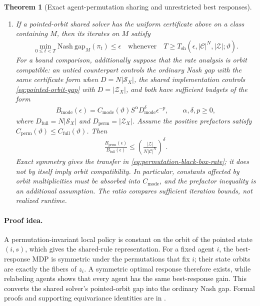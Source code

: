 \documentclass{article}
\theoremstyle{plain}
\newtheorem{theorem}{Theorem}
\theoremstyle{definition}
\theoremstyle{remark}
\newcommand{\Nash}{\mathrm{Nash\ gap}}
\newcommand{\abs}[1]{\left\lvert#1\right\rvert}
\begin{document}
\begin{theorem}[Exact agent-permutation sharing and unrestricted best responses]
\begin{enumerate}[label=\arabic*.,leftmargin=2.0em,itemsep=2pt,topsep=2pt]
  \item \label{item:permutation-rate-transfer}
  If a pointed-orbit shared solver has the uniform certificate above on a
  class containing $M$, then its iterates on $M$ satisfy
  \begin{align}
    \min_{0\le t<T}\Nash_M(\pi_t)
    \le\epsilon
    \quad\text{whenever}\quad
    T\ge
    T_{\mathrm{sh}}\!\left(
      \epsilon,\abs{\mathcal C}^{N},\abs{\mathcal Z};\vartheta
    \right).
    \label{eq:permutation-black-box-rate}
  \end{align}
  For a bound comparison, additionally suppose that the rate analysis is
  \emph{orbit compatible}: an untied counterpart controls the ordinary Nash
  gap with the same certificate form when
  $D=N\abs{\mathcal S_X}$, the shared implementation controls
  \eqref{eq:pointed-orbit-gap} with $D=\abs{\mathcal Z_X}$, and both have
  sufficient budgets of the form
  \begin{align*}
    B_{\mathrm{mode}}(\epsilon)
    =
    C_{\mathrm{mode}}(\vartheta)
    S^\alpha D_{\mathrm{mode}}^\delta\epsilon^{-p},
    \qquad
    \alpha,\delta,p\ge0,
  \end{align*}
  where
  $D_{\mathrm{full}}=N\abs{\mathcal S_X}$ and
  $D_{\mathrm{perm}}=\abs{\mathcal Z_X}$.
  Assume the positive prefactors satisfy
  $C_{\mathrm{perm}}(\vartheta)\le C_{\mathrm{full}}(\vartheta)$.
  Then
  \begin{align}
    \frac{B_{\mathrm{perm}}(\epsilon)}
         {B_{\mathrm{full}}(\epsilon)}
    \le
    \left(
      \frac{
        \abs{\mathcal Z}
      }{
        N\abs{\mathcal C}^{N}
      }
    \right)^\delta.
    \label{eq:permutation-block-rate-factor}
  \end{align}
  Exact symmetry gives the transfer in
  \eqref{eq:permutation-black-box-rate}; it does not by itself imply orbit
  compatibility. In particular, constants affected by orbit multiplicities
  must be absorbed into $C_{\mathrm{mode}}$, and the prefactor inequality is
  an additional assumption. The ratio compares sufficient iteration bounds,
  not realized runtime.
\end{enumerate}
\end{theorem}

\paragraph{Proof idea.}
A permutation-invariant local policy is constant on the orbit of the pointed
state $(i,s)$, which gives the shared-rule representation. For a fixed agent
$i$, the best-response MDP is symmetric under the permutations that fix $i$;
their state orbits are exactly the fibers of $z_i$. A symmetric optimal response
therefore exists, while relabeling agents shows that every agent has the same
best-response gain. This converts the shared solver's pointed-orbit gap into the
ordinary Nash gap. Formal proofs and supporting equivariance identities are in
.
\end{document}

